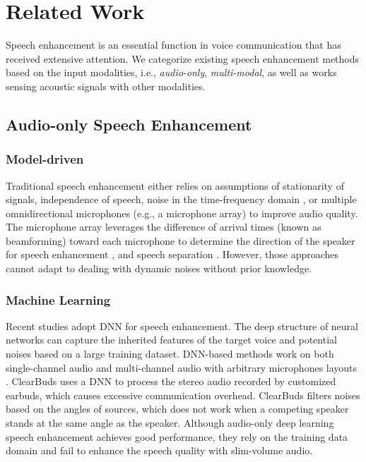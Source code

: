 \section{Related Work}\label{sec:vibvoice_relatedwork}

Speech enhancement is an essential function in voice communication that has received extensive attention. We categorize existing speech enhancement methods based on the input modalities, i.e., \textit{audio-only}, \textit{multi-modal}, as well as works sensing acoustic signals with other modalities.

\subsection{Audio-only Speech Enhancement}

\subsubsection{Model-driven}
Traditional speech enhancement either relies on assumptions of stationarity of signals, independence of speech, noise in the time-frequency domain \citep{ephraim1995signal}, or multiple omnidirectional microphones (e.g., a microphone array) to improve audio quality. The microphone array leverages the difference of arrival times (known as beamforming) toward each microphone to determine the direction of the speaker for speech enhancement \citep{yousefian2014hybrid,ji2017coherence}, and speech separation \citep{wood2017blind,kitamura2016determined}. However, those approaches cannot adapt to dealing with dynamic noises without prior knowledge.

\subsubsection{Machine Learning}
Recent studies adopt DNN \citep{subakan2021attention, zhang2021microphone, chatterjee2022clearbuds} for speech enhancement. The deep structure of neural networks can capture the inherited features of the target voice and potential noises based on a large training dataset.
DNN-based methods work on both single-channel audio \citep{subakan2021attention} and multi-channel audio with arbitrary microphones layouts \citep{zhang2021microphone}. ClearBuds \citep{chatterjee2022clearbuds} uses a DNN to process the stereo audio recorded by customized earbuds, which causes excessive communication overhead. ClearBuds filters noises based on the angles of sources, which does not work when a competing speaker stands at the same angle as the speaker.
Although audio-only deep learning speech enhancement achieves good performance, they rely on the training data domain and fail to enhance the speech quality with slim-volume audio.


